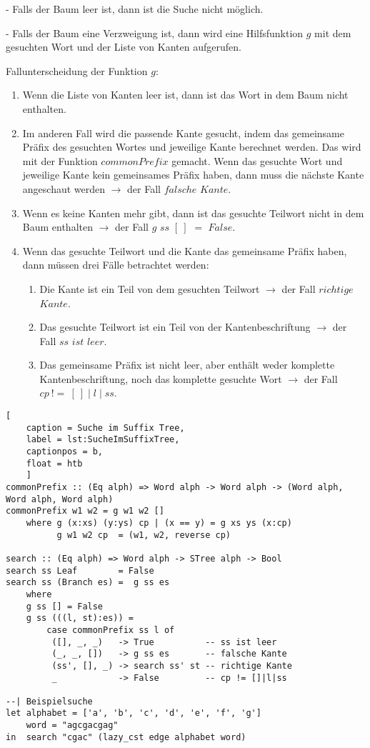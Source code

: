 \documentclass[12pt]{report}
\begin{document}
    - Falls der Baum leer ist, dann ist die Suche nicht möglich.

    - Falls der Baum eine Verzweigung ist, dann wird eine Hilfsfunktion $g$ mit dem gesuchten Wort und der Liste von Kanten aufgerufen.

Fallunterscheidung der Funktion $g$:
\begin{enumerate}
    \item Wenn die Liste von Kanten leer ist, dann ist das Wort in dem Baum nicht enthalten.
    \item Im anderen Fall wird die passende Kante gesucht, indem das gemeinsame Präfix des gesuchten Wortes und jeweilige Kante berechnet werden. Das wird mit der Funktion $commonPrefix$ gemacht. Wenn das gesuchte Wort und jeweilige Kante kein gemeinsames Präfix haben, dann muss die nächste Kante angeschaut werden $\rightarrow$ der Fall $falsche$ $Kante$.
    \item Wenn es keine Kanten mehr gibt, dann ist das gesuchte Teilwort nicht in dem Baum enthalten $\rightarrow$ der Fall $g$ $ss$ $[\:]$ $=$ $False$.
    \item Wenn das gesuchte Teilwort und die Kante das gemeinsame Präfix haben, dann müssen drei Fälle betrachtet werden:
    \begin{enumerate}
        \item Die Kante ist ein Teil von dem gesuchten Teilwort $\rightarrow$ der Fall $richtige$ $Kante$.
        \item Das gesuchte Teilwort ist ein Teil von der Kantenbeschriftung $\rightarrow$ der Fall $ss$ $ist$ $leer$.
        \item Das gemeinsame Präfix ist nicht leer, aber enthält weder komplette Kantenbeschriftung, noch das komplette gesuchte Wort $\rightarrow$ der Fall $cp\:!=\:[\:]\mid l \mid ss$.
    \end{enumerate}
\end{enumerate}

\begin{lstlisting}[
    caption = Suche im Suffix Tree,
    label = lst:SucheImSuffixTree,
    captionpos = b,
    float = htb
    ]
commonPrefix :: (Eq alph) => Word alph -> Word alph -> (Word alph, Word alph, Word alph)
commonPrefix w1 w2 = g w1 w2 []
    where g (x:xs) (y:ys) cp | (x == y) = g xs ys (x:cp)
          g w1 w2 cp  = (w1, w2, reverse cp)

search :: (Eq alph) => Word alph -> STree alph -> Bool
search ss Leaf        = False
search ss (Branch es) =  g ss es
    where
    g ss [] = False
    g ss (((l, st):es)) =
        case commonPrefix ss l of
         ([], _, _)   -> True          -- ss ist leer
         (_, _, [])   -> g ss es       -- falsche Kante
         (ss', [], _) -> search ss' st -- richtige Kante
         _            -> False         -- cp != []|l|ss

--| Beispielsuche
let alphabet = ['a', 'b', 'c', 'd', 'e', 'f', 'g']
    word = "agcgacgag"
in  search "cgac" (lazy_cst edge alphabet word)
\end{lstlisting}
\end{document}
